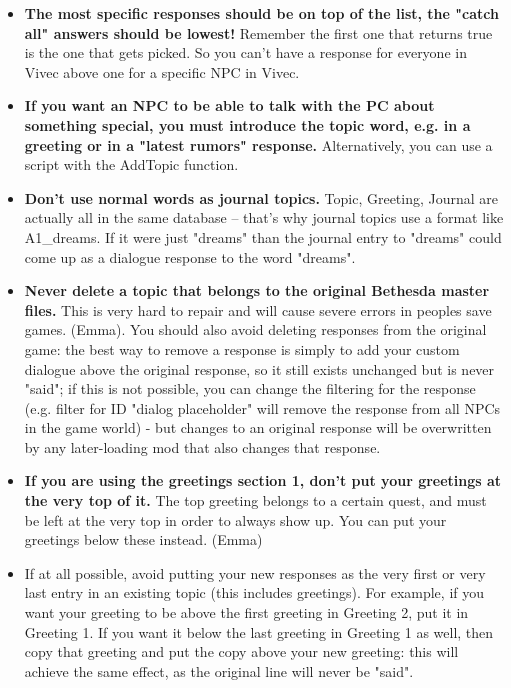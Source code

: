\begin{itemize}
\item
  \textbf{The most specific responses should be on top of the list, the
  "catch all" answers should be lowest!} Remember the first one that
  returns true is the one that gets picked. So you can't have a response
  for everyone in Vivec above one for a specific NPC in Vivec.
\item
  \textbf{If you want an NPC to be able to talk with the PC about
  something special, you must introduce the topic word, e.g. in a
  greeting or in a "latest rumors" response.} Alternatively, you can use
  a script with the AddTopic function.
\item
  \textbf{Don't use normal words as journal topics.} Topic, Greeting,
  Journal are actually all in the same database -- that's why journal
  topics use a format like A1\_dreams. If it were just "dreams" than the
  journal entry to "dreams" could come up as a dialogue response to the
  word "dreams".
\item
  \textbf{Never delete a topic that belongs to the original Bethesda
  master files.} This is very hard to repair and will cause severe
  errors in peoples save games. (Emma). You should also avoid deleting
  responses from the original game: the best way to remove a response is
  simply to add your custom dialogue above the original response, so it
  still exists unchanged but is never "said"; if this is not possible,
  you can change the filtering for the response (e.g. filter for ID
  "dialog placeholder" will remove the response from all NPCs in the
  game world) - but changes to an original response will be overwritten
  by any later-loading mod that also changes that response.
\item
  \textbf{If you are using the greetings section 1, don't put your
  greetings at the very top of it.} The top greeting belongs to a
  certain quest, and must be left at the very top in order to always
  show up. You can put your greetings below these instead. (Emma)
\item
  If at all possible, avoid putting your new responses as the very first
  or very last entry in an existing topic (this includes greetings). For
  example, if you want your greeting to be above the first greeting in
  Greeting 2, put it in Greeting 1. If you want it below the last
  greeting in Greeting 1 as well, then copy that greeting and put the
  copy above your new greeting: this will achieve the same effect, as
  the original line will never be "said".
\end{itemize}

